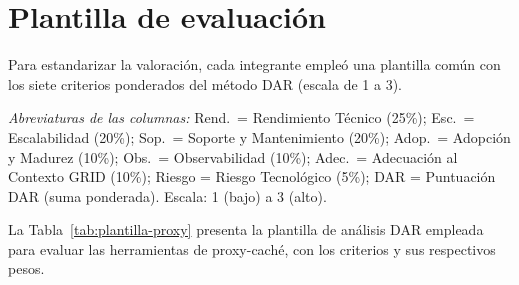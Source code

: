 \section{Plantilla de evaluación}
Para estandarizar la valoración, cada integrante empleó una plantilla común con los siete criterios ponderados del método DAR (escala de 1 a 3).

\medskip\noindent\textit{Abreviaturas de las columnas:} Rend.\ = Rendimiento Técnico (25\%); Esc.\ = Escalabilidad (20\%); Sop.\ = Soporte y Mantenimiento (20\%); Adop.\ = Adopción y Madurez (10\%); Obs.\ = Observabilidad (10\%); Adec.\ = Adecuación al Contexto GRID (10\%); Riesgo = Riesgo Tecnológico (5\%); DAR = Puntuación DAR (suma ponderada). Escala: 1 (bajo) a 3 (alto).\par\medskip


La Tabla~\ref{tab:plantilla-proxy} presenta la plantilla de análisis DAR empleada para evaluar las herramientas de proxy-caché, con los criterios y sus respectivos pesos.

